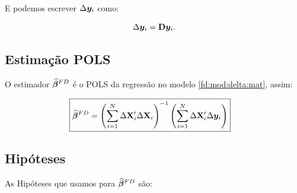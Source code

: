 \documentclass[11pt, oneside, a4paper, article]{article}
\numberwithin{equation}{section}
\begin{document}
\noindent
E podemos escrever $\Delta \boldsymbol{y}_{i}$ como:

\vspace{-1 em}
\begin{align*}
	\Delta \boldsymbol{y}_{i} = \mathbf{D} \boldsymbol{y}_{i}.
\end{align*}

\subsection{Estimação POLS}

O estimador $\widehat{\boldsymbol{\beta}}^{FD}$ é o POLS da regressão no modelo \eqref{fd:mod:delta:mat}, assim:

\vspace{-1 em}
\begin{align} \label{fd:betahat}
\Aboxed{
\betavechat^{FD} =
\left( \sum_{i=1}^{N} \Delta \Xmat_{i}' \Delta \Xmat_{i} \right)^{-1}
\left( \sum_{i=1}^{N} \Delta \Xmat_{i}' \Delta \yvec_{i} \right)
}
\end{align}

\subsection{Hipóteses}

As Hipóteses que usamos para $\widehat{\boldsymbol{\beta}}^{FD}$ são:
\end{document}
